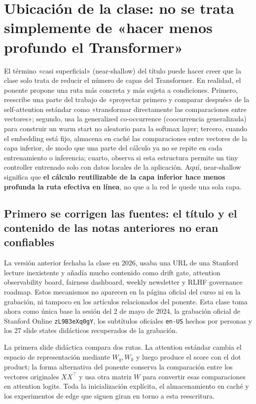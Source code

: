 \section{Ubicación de la clase: no se trata simplemente de «hacer menos profundo el Transformer»}

El término «casi superficial» (near-shallow) del título puede hacer creer que la clase solo trata de reducir el número de capas del Transformer. En realidad, el ponente propone una ruta más concreta y más sujeta a condiciones. Primero, reescribe una parte del trabajo de «proyectar primero y comparar después» de la self-attention estándar como «transformar directamente las comparaciones entre vectores»; segundo, usa la generalized co-occurrence (coocurrencia generalizada) para construir un warm start no aleatorio para la softmax layer; tercero, cuando el embedding está fijo, almacena en caché las comparaciones entre vectores de la capa inferior, de modo que una parte del cálculo ya no se repite en cada entrenamiento o inferencia; cuarto, observa si esta estructura permite un tiny controller entrenado solo con datos locales de la aplicación. Aquí, near-shallow significa que \textbf{el cálculo reutilizable de la capa inferior hace menos profunda la ruta efectiva en línea}, no que a la red le quede una sola capa.

\subsection{Primero se corrigen las fuentes: el título y el contenido de las notas anteriores no eran confiables}

La versión anterior fechaba la clase en 2026, usaba una URL de una Stanford lecture inexistente y añadía mucho contenido como drift gate, attention observability board, fairness dashboard, weekly newsletter y RLHF governance roadmap. Estos mecanismos no aparecen en la página oficial del curso ni en la grabación, ni tampoco en los artículos relacionados del ponente. Esta clase toma ahora como única base la sesión del 2 de mayo de 2024, la grabación oficial de Stanford Online \texttt{zL9B3eXq0gY}, los subtítulos oficiales \texttt{en-US} hechos por personas y los 27 slide states didácticos recuperados de la grabación.


La primera slide didáctica compara dos rutas. La attention estándar cambia el espacio de representación mediante $W_q,W_k$ y luego produce el score con el dot product; la forma alternativa del ponente conserva la comparación entre los vectores originales $XX^\top$ y usa otra matriz $W$ para convertir esas comparaciones en attention logits. Toda la inicialización explícita, el almacenamiento en caché y los experimentos de edge que siguen giran en torno a esta reescritura.

